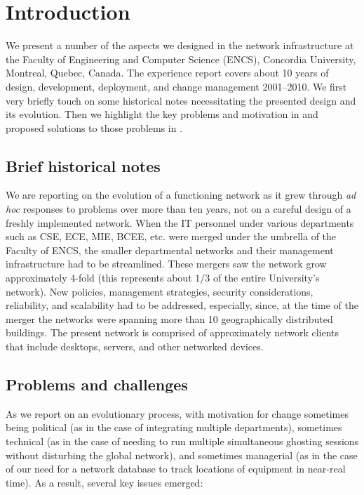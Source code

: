 \section{Introduction}
\label{sect:intro}

We present a number of the aspects we designed in the network infrastructure
at the
Faculty of Engineering and Computer Science (ENCS), Concordia University,
Montreal, Quebec, Canada.
The experience report covers about 10 years of
design, development, deployment, and change management 2001--2010. 
We first very briefly touch on some historical notes necessitating the
presented design and its evolution. Then we highlight the key problems and motivation in 
and proposed solutions to those problems in .


\subsection{Brief historical notes}
\label{sect:brief-history}

We are reporting on the evolution of a functioning network as it
grew through {\em ad hoc} responses to problems over more than ten
years, not on a careful design of a freshly implemented network.
When the IT personnel under various departments such as CSE, ECE, MIE, BCEE, etc.
were merged under the umbrella of the Faculty of ENCS, the smaller departmental
networks and their management infrastructure had to be streamlined.
These mergers saw
the network grow approximately 4-fold (this represents about $1/3$ of the entire University's
network). New policies, management strategies, security
considerations, reliability, and scalability had to be addressed, especially, since, at the
time of the merger the networks were spanning more than 10 geographically
distributed buildings. The present network is comprised of approximately {\netclients}
network clients
that include desktops, servers, and other networked devices.

\subsection{Problems and challenges}
\label{sect:problems}

As we report on an evolutionary process, with motivation for change sometimes being
political (as in the case of integrating multiple departments),
sometimes technical (as in the case of needing to run multiple
simultaneous ghosting sessions without disturbing the global
network), and sometimes managerial (as in the case of our
need for a network database to track locations of equipment
in near-real time).
As a result, several key issues emerged:

